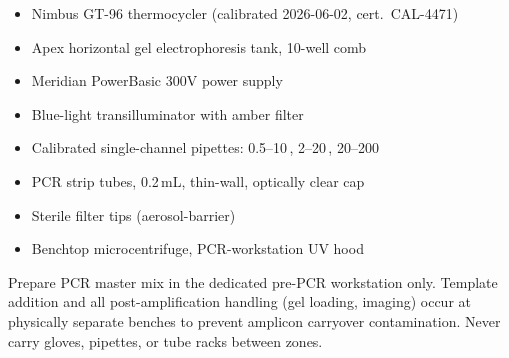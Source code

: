 \begin{minipage}[t]{0.48\linewidth}
\begin{itemize}
  \item Nimbus GT-96 thermocycler (calibrated 2026-06-02, cert.\ CAL-4471)
  \item Apex horizontal gel electrophoresis tank, 10-well comb
  \item Meridian PowerBasic 300V power supply
  \item Blue-light transilluminator with amber filter
\end{itemize}
\end{minipage}\hfill
\begin{minipage}[t]{0.48\linewidth}
\begin{itemize}
  \item Calibrated single-channel pipettes: 0.5--10\,\uL, 2--20\,\uL, 20--200\,\uL
  \item PCR strip tubes, 0.2\,mL, thin-wall, optically clear cap
  \item Sterile filter tips (aerosol-barrier)
  \item Benchtop microcentrifuge, PCR-workstation UV hood
\end{itemize}
\end{minipage}
\par

\begin{cautionbox}
Prepare PCR master mix in the dedicated pre-PCR workstation only. Template addition and all
post-amplification handling (gel loading, imaging) occur at physically separate benches to
prevent amplicon carryover contamination. Never carry gloves, pipettes, or tube racks between
zones.
\end{cautionbox}
